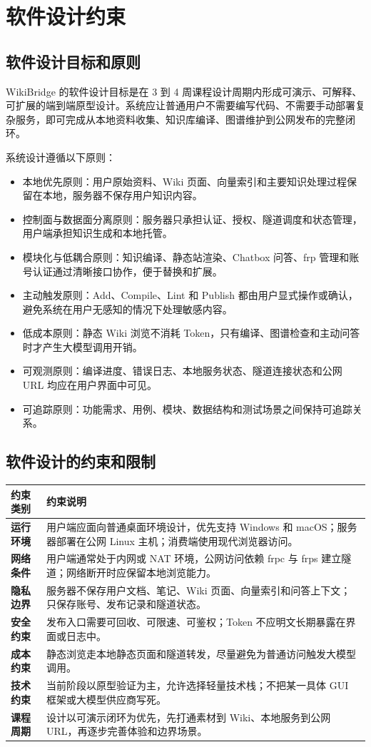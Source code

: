 \documentclass[UTF8,a4paper,12pt,fontset=fandol]{ctexart}
\begin{document}
\section{软件设计约束}

\subsection{软件设计目标和原则}
WikiBridge 的软件设计目标是在 3 到 4 周课程设计周期内形成可演示、可解释、可扩展的端到端原型设计。系统应让普通用户不需要编写代码、不需要手动部署复杂服务，即可完成从本地资料收集、知识库编译、图谱维护到公网发布的完整闭环。

系统设计遵循以下原则：
\begin{itemize}
  \item 本地优先原则：用户原始资料、Wiki 页面、向量索引和主要知识处理过程保留在本地，服务器不保存用户知识内容。
  \item 控制面与数据面分离原则：服务器只承担认证、授权、隧道调度和状态管理，用户端承担知识生成和本地托管。
  \item 模块化与低耦合原则：知识编译、静态站渲染、Chatbox 问答、frp 管理和账号认证通过清晰接口协作，便于替换和扩展。
  \item 主动触发原则：Add、Compile、Lint 和 Publish 都由用户显式操作或确认，避免系统在用户无感知的情况下处理敏感内容。
  \item 低成本原则：静态 Wiki 浏览不消耗 Token，只有编译、图谱检查和主动问答时才产生大模型调用开销。
  \item 可观测原则：编译进度、错误日志、本地服务状态、隧道连接状态和公网 URL 均应在用户界面中可见。
  \item 可追踪原则：功能需求、用例、模块、数据结构和测试场景之间保持可追踪关系。
\end{itemize}

\subsection{软件设计的约束和限制}
\begin{longtable}{>{\bfseries}p{3.2cm}p{11.0cm}}
\toprule
约束类别 & 约束说明 \\
\midrule
运行环境 & 用户端应面向普通桌面环境设计，优先支持 Windows 和 macOS；服务器部署在公网 Linux 主机；消费端使用现代浏览器访问。 \\
网络条件 & 用户端通常处于内网或 NAT 环境，公网访问依赖 frpc 与 frps 建立隧道；网络断开时应保留本地浏览能力。 \\
隐私边界 & 服务器不保存用户文档、笔记、Wiki 页面、向量索引和问答上下文；只保存账号、发布记录和隧道状态。 \\
安全约束 & 发布入口需要可回收、可限速、可鉴权；Token 不应明文长期暴露在界面或日志中。 \\
成本约束 & 静态浏览走本地静态页面和隧道转发，尽量避免为普通访问触发大模型调用。 \\
技术约束 & 当前阶段以原型验证为主，允许选择轻量技术栈；不把某一具体 GUI 框架或大模型供应商写死。 \\
课程周期 & 设计以可演示闭环为优先，先打通素材到 Wiki、本地服务到公网 URL，再逐步完善体验和边界场景。 \\
\bottomrule
\end{longtable}
\end{document}
